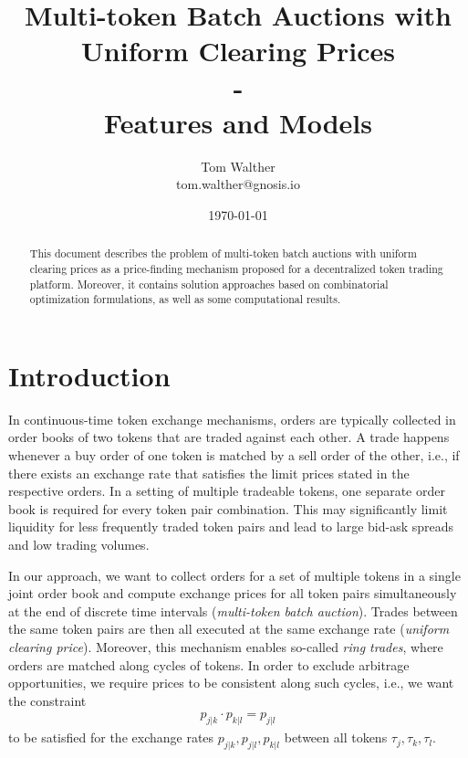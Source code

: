 \documentclass[11pt,parskip=full]{scrartcl}%
\title{
  Multi-token Batch Auctions with Uniform Clearing Prices\\
  - \\
  \Large Features and Models}
\author{Tom Walther \\ tom.walther@gnosis.io}
\date{\today}
\newcommand*{\ie}{i.e., }
\begin{document}
\maketitle


\begin{abstract}
  This document describes the problem of multi-token batch auctions with uniform clearing prices
  as a price-finding mechanism proposed for a decentralized token trading platform.
  Moreover, it contains solution approaches based on combinatorial optimization formulations,
  as well as some computational results.
\end{abstract}



\tableofcontents

\newpage
\section{Introduction}
\label{sec:introduction}

In continuous-time token exchange mechanisms, orders are typically collected in order books of two
tokens that are traded against each other.
A trade happens whenever a buy order of one token is matched by a sell order of the other, \ie if
there exists an exchange rate that satisfies the limit prices stated in the respective orders.
In a setting of multiple tradeable tokens, one separate order book is required for every token pair
combination.
This may significantly limit liquidity for less frequently traded token pairs and lead to large
bid-ask spreads and low trading volumes.

In our approach, we want to collect orders for a set of multiple tokens in a single joint order
book and compute exchange prices for all token pairs simultaneously at the end of discrete time
intervals (\emph{multi-token batch auction}).
Trades between the same token pairs are then all executed at the same exchange rate (\emph{uniform
clearing price}).
Moreover, this mechanism enables so-called \emph{ring trades}, where orders are matched along
cycles of tokens.
In order to exclude arbitrage opportunities, we require prices to be consistent along such cycles,
\ie we want the constraint
\begin{align}
  p_{j|k} \cdot p_{k|l} = p_{j|l}
  \label{eq:arbitrage_freeness}
\end{align}
to be satisfied for the exchange rates $p_{j|k}, p_{j|l}, p_{k|l}$ between all tokens
$ \tau_j, \tau_k, \tau_l $.
\end{document}
